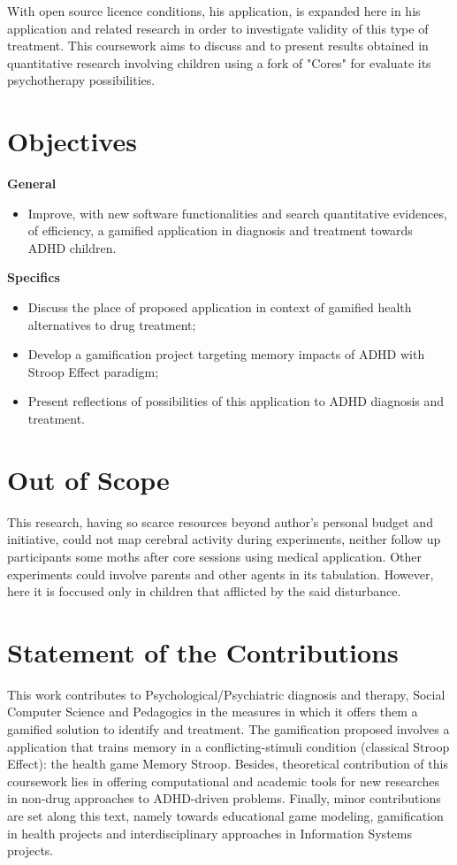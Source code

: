 With open source licence conditions, his application, is expanded here in his application and related research in order to investigate validity of this type of treatment. This coursework aims to discuss and to present results obtained in quantitative research involving children using a fork of "Cores" for evaluate its psychotherapy possibilities. 


\section{Objectives}
\label{sc:objectives}

\textbf{General}
\label{sc:objetivosGerais}
\begin{itemize}
\item Improve, with new software functionalities and search quantitative evidences, of efficiency, a gamified application in diagnosis and treatment towards ADHD children. 
\end{itemize}

\textbf{Specifics}
\label{sc:objetivosEspecificos}
\begin{itemize}
\item Discuss the place of proposed application in context of gamified health alternatives to drug treatment;
\item Develop a gamification project targeting memory impacts of ADHD with Stroop Effect paradigm;
\item Present reflections of possibilities of this application to ADHD diagnosis and treatment.


\end{itemize}

\section{Out of Scope}
\label{sc:outofscope}
This research, having so scarce resources beyond author's personal budget and initiative, could not map cerebral activity during experiments, neither follow up participants some moths after core sessions using medical application. Other experiments could involve parents and other agents in its tabulation. However, here it is foccused only in children that afflicted by the said disturbance.


\section{Statement of the Contributions}

This work contributes to Psychological/Psychiatric diagnosis and therapy, Social Computer Science and Pedagogics in the measures in which it offers them a gamified solution to identify and treatment. The gamification proposed involves a application that trains memory in a conflicting-stimuli condition (classical Stroop Effect): the health game Memory Stroop. Besides, theoretical contribution of this coursework lies in offering computational and academic tools for new researches in non-drug approaches to ADHD-driven problems. Finally, minor contributions are set along this text, namely towards educational game modeling, gamification in health projects and interdisciplinary approaches in Information Systems projects.

